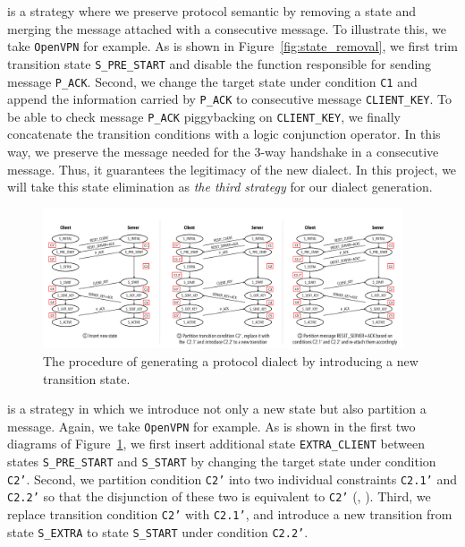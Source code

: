 { is a strategy
where we preserve protocol semantic by removing a state and merging the message
attached with a consecutive message. To illustrate this, we take
\texttt{OpenVPN} for example. As is shown in Figure~\ref{fig:state_removal}, we
first trim transition state \texttt{S\_PRE\_START} and disable the function
responsible for sending message \texttt{P\_ACK}. Second, we change the target
state under condition \texttt{C1} and append the information carried by
\texttt{P\_ACK} to consecutive message \texttt{CLIENT\_KEY}. To be able to check
message \texttt{P\_ACK} piggybacking on \texttt{CLIENT\_KEY}, we finally
concatenate the transition conditions with a logic conjunction operator. In this
way, we preserve the message needed for the 3-way handshake in a consecutive
message. Thus, it guarantees the legitimacy of the new dialect. In this project,
we will take this state elimination as \emph{the third strategy} for our dialect
generation.


\begin{figure}[t]
\centering
\includegraphics[width=0.95\textwidth]{figure/state_addition}
\caption{The procedure of generating a protocol dialect by introducing a new 
  transition state.} 
\vspace{-0.1in} 
\label{fig:state_addition} 
\end{figure} 

{ is a  strategy in
which we introduce not only a new state but also partition a message. Again, we
take \texttt{OpenVPN} for example. As is shown in the first two diagrams of
Figure~\ref{fig:state_addition}, we first insert additional state
\texttt{EXTRA\_CLIENT} between states \texttt{S\_PRE\_START} and
\texttt{S\_START} by changing the target state under condition \texttt{C2'}.
Second, we partition condition \texttt{C2'} into two individual constraints
\texttt{C2.1'} and \texttt{C2.2'} so that the disjunction of these two is
equivalent to \texttt{C2'} (\ie, ). Third, we replace
transition condition \texttt{C2'} with \texttt{C2.1'}, and introduce a new
transition from state \texttt{S\_EXTRA} to state \texttt{S\_START} under
condition \texttt{C2.2'}.

}}
